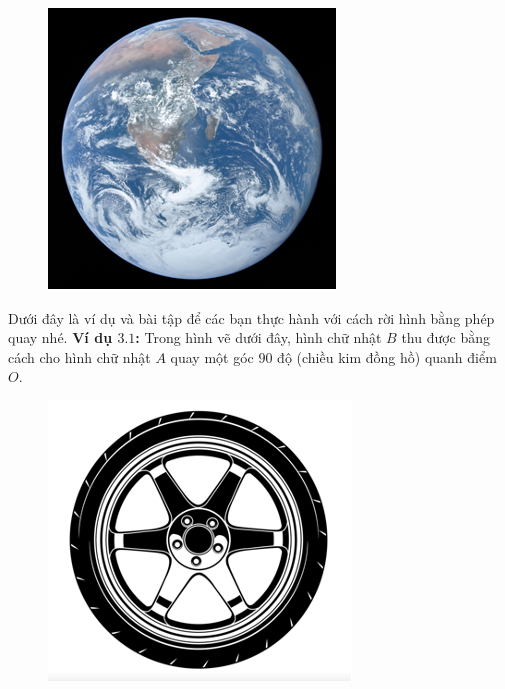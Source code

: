 \begin{multicols}{2}
\begin{figure}[H]
		\includegraphics[width= 1\linewidth]{Picture23}
		\vspace*{-10pt}
	\end{figure}
	Dưới đây là ví dụ và bài tập để các bạn thực hành với cách rời hình bằng phép quay nhé.
	\vskip 0.1cm
	\textbf{\color{toancuabi}Ví dụ $\pmb{3.1}$:} Trong hình vẽ dưới đây, hình chữ nhật $B$ thu được bằng cách cho hình chữ nhật $A$ quay một góc $90$ độ (chiều kim đồng hồ) quanh điểm $O$.
	\begin{figure}[H]
		\vspace*{-5pt}
		\centering
		\captionsetup{labelformat= empty, justification=centering}
		\includegraphics[width= 1\linewidth]{Picture24}

\end{figure}
\end{multicols}
